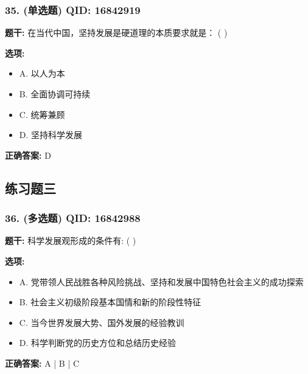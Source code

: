 \documentclass[12pt,UTF8]{ctexart}
\begin{document}
\subsubsection*{35. (单选题) \small QID: 16842919}

\textbf{题干:}
在当代中国，坚持发展是硬道理的本质要求就是： ( )

\textbf{选项:}
\begin{itemize}[leftmargin=*]

  \item A. 以人为本

  \item B. 全面协调可持续

  \item C. 统筹兼顾

  \item D. 坚持科学发展

\end{itemize}

\textbf{正确答案:}
D

\vspace{0.3em}\hrulefill\vspace{0.7em}

\subsection*{练习题三}

\subsubsection*{36. (多选题) \small QID: 16842988}

\textbf{题干:}
科学发展观形成的条件有: ( )

\textbf{选项:}
\begin{itemize}[leftmargin=*]

  \item A. 党带领人民战胜各种风险挑战、坚持和发展中国特色社会主义的成功探索

  \item B. 社会主义初级阶段基本国情和新的阶段性特征

  \item C. 当今世界发展大势、国外发展的经验教训

  \item D. 科学判断党的历史方位和总结历史经验

\end{itemize}

\textbf{正确答案:}
A | B | C
\end{document}
